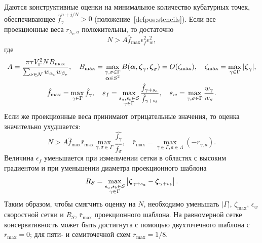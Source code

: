 Даются конструктивные оценки на минимальное количество кубатурных точек,
обеспечивающее \(\hat{f}_\gamma^{n+j/N}>0\) (положение~\ref{defpos:stencils}).
Если все проекционные веса \(r_{\lambda_\nu,a}\) положительны, то достаточно
\begin{equation*}
    N > A \hat{f}_{\max} \epsilon_f^2 \epsilon_w^2,
\end{equation*}
где
\begin{gather*}
    A = \frac{\pi\tau V_\Gamma^2 N B_{\max}}{\sum_{\nu\in\mathcal{N}} w_{\alpha_\nu}w_{\beta_\nu}}, \quad
    B_{\max} = \max_{\substack{\gamma,\sigma\in\Gamma\\\boldsymbol{\alpha}\in S^2}}
        B(\boldsymbol{\alpha}, {\boldsymbol{\zeta}}_{\gamma}, {\boldsymbol{\zeta}}_{\sigma}) = O(\zeta_{\max}), \quad
    \zeta_{\max} = \max_{\gamma\in\Gamma}|{\boldsymbol{\zeta}}_\gamma|, \\
    \hat{f}_{\max} = \max_{\gamma\in\Gamma} \hat{f}_\gamma, \quad
    \varepsilon_f = \max_{\substack{s_a,s_b\in\mathcal{S}\\\gamma\in\Gamma}} \frac{\hat{f}_{\gamma+s_a}}{\hat{f}_{\gamma+s_b}}, \quad
    \varepsilon_w = \max_{\gamma,\sigma\in\Gamma} \frac{w_\gamma}{w_\sigma}.
\end{gather*}
Если же проекционные веса принимают отрицательные значения, то оценка значительно ухудшается:
\begin{equation*}
    N > A \hat{f}_{\max} \bar{r}_{\max} \max_{\gamma,\sigma\in\Gamma}\frac{\hat{f_\gamma}}{\hat{f_\sigma}}, \quad
    \bar{r}_{\max} = \max_{\gamma\in\Gamma,a\in\Lambda}( -r_{\gamma,a} ).
\end{equation*}
Величина \(\epsilon_f\) уменьшается при измельчении сетки в областях с высоким градиентом
и при уменьшении диаметра проекционного шаблона
\begin{equation*}
    R_\mathcal{S} = \max_{\substack{s_a,s_b\in\mathcal{S}\\\gamma\in\Gamma}}
        \left| {\boldsymbol{\zeta}}_{\gamma+s_a} - {\boldsymbol{\zeta}}_{\gamma+s_b} \right|.
\end{equation*}
Таким образом, чтобы смягчить оценку на \(N\),
необходимо уменьшать \(|\Gamma|\), \(\zeta_{\max}\), \(\epsilon_w\) скоростной сетки
и \(R_\mathcal{S}\), \(\bar{r}_{\max}\) проекционного шаблона.
На равномерной сетке консервативность может быть достигнута с помощью двухточечного шаблона с \(\bar{r}_{\max}=0\);
для пяти- и семиточечной схем \(\bar{r}_{\max}=1/8\).

